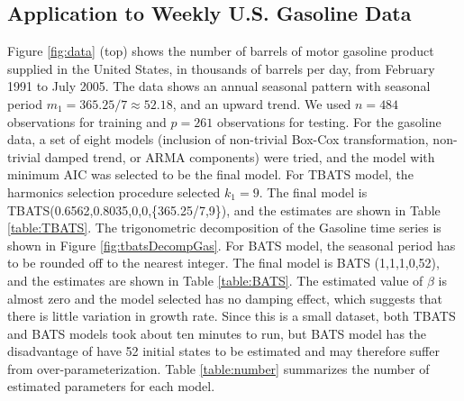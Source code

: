 \documentclass{uwstat572}
\begin{document}
\subsection{Application to Weekly U.S. Gasoline Data}
\hspace{4ex}Figure \ref{fig:data} (top) shows the number of barrels of motor gasoline product supplied in the United States, in thousands of barrels per day, from February 1991 to July 2005. The data shows an annual seasonal pattern with seasonal period $m_1=365.25/7 \approx 52.18$, and an upward trend. We used $n=484$ observations for training and $p=261$ observations for testing. For the gasoline data, a set of eight models (inclusion of non-trivial Box-Cox transformation, non-trivial damped trend, or ARMA components) were tried, and the model with minimum AIC was selected to be the final model.  For TBATS model, the harmonics selection procedure selected $k_1=9$. The final model is TBATS(0.6562,0.8035,0,0,\{365.25/7,9\}), and the estimates are shown in Table \ref{table:TBATS}. The trigonometric decomposition of the Gasoline time series is shown in Figure \ref{fig:tbatsDecompGas}. For BATS model, the seasonal period has to be rounded off to the nearest integer. The final model is BATS (1,1,1,0,52), and the estimates are shown in Table \ref{table:BATS}. The estimated value of $\beta$ is almost zero and the model selected has no damping effect, which suggests that there is little variation in growth rate. Since this is a small dataset, both TBATS and BATS models took about ten minutes to run, but BATS model has the disadvantage of have 52 initial states to be estimated and may therefore suffer from over-parameterization. Table \ref{table:number} summarizes the number of estimated parameters for each model.
\end{document}

